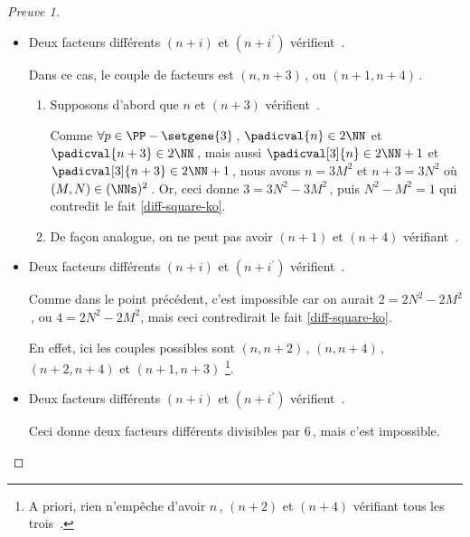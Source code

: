 \begin{proof}[Preuve 1]
\begin{itemize}
		


    	\medskip
		\item Deux facteurs différents $(n+i)$ et $(n+i^\prime)$ vérifient \,.
		
		\smallskip
		\noindent
		Dans ce cas, le couple de facteurs est $(n, n + 3)$\,, ou $(n + 1, n + 4)$\,.    
		\begin{enumerate}
			\item Supposons d'abord que $n$ et $(n+3)$ vérifient \,.
			
			\noindent
			Comme $\forall p \in \PP - \setgene{3}$\,, $\padicval{n} \in 2 \NN$ et $\padicval{n + 3} \in 2 \NN$\,,
			mais aussi $\padicval[3]{n} \in 2 \NN + 1$ et $\padicval[3]{n + 3} \in 2 \NN + 1$\,,
			nous avons $n = 3 M^2$ et $n+3 = 3 N^2$ où $(M, N) \in ( \NNs )^2$\,.
			Or, ceci donne $3 = 3 N^2 - 3 M^2$\,, puis $N^2 - M^2 = 1$ qui contredit le fait \ref{diff-square-ko}.

			\item De façon analogue, on ne peut pas avoir $(n+1)$ et $(n+4)$ vérifiant \,.
		\end{enumerate}


    	\medskip
		\item Deux facteurs différents $(n+i)$ et $(n+i^\prime)$ vérifient \,.
		
		\smallskip
		\noindent
		Comme dans le point précédent, c'est impossible car on aurait $2 = 2 N^2 - 2 M^2$\,, ou $4 = 2 N^2 - 2 M^2$, mais ceci contredirait le fait \ref{diff-square-ko}. 
		
		\smallskip
		
		\noindent
		En effet, ici les couples possibles sont $(n, n + 2)$\,, $(n, n + 4)$\,,  $(n + 2, n + 4)$ et $(n + 1, n + 3)$
		\footnote{
			A priori, rien n'empêche d'avoir $n$\,, $(n + 2)$ et $(n + 4)$ vérifiant tous les trois \,.
		}.


    	\medskip
		\item Deux facteurs différents $(n+i)$ et $(n+i^\prime)$ vérifient \,.
		
		\smallskip
		\noindent
		Ceci donne deux facteurs différents divisibles par $6$\,, mais c'est impossible. \qedhere
    \end{itemize}
\end{proof}


